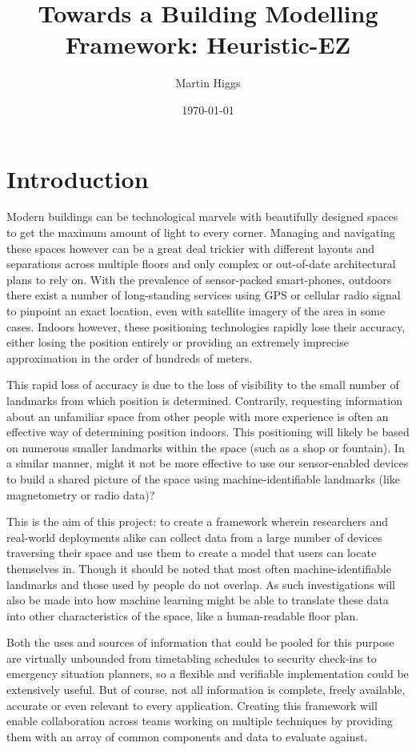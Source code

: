 \documentclass{UoYCSproject}
\title{Towards a Building Modelling Framework: Heuristic-EZ}
\author{Martin Higgs}
\date{\today}
\begin{document}
	
	\maketitle
	
	\chapter{Introduction}
    \label{chap:intro}
    
        Modern buildings can be technological marvels with beautifully designed spaces to get the maximum amount of light to every corner. Managing and navigating these spaces however can be a great deal trickier with different layouts and separations across multiple floors and only complex or out-of-date architectural plans to rely on. With the prevalence of sensor-packed smart-phones, outdoors there exist a number of long-standing services using GPS or cellular radio signal to pinpoint an exact location, even with satellite imagery of the area in some cases. Indoors however, these positioning technologies rapidly lose their accuracy, either losing the position entirely or providing an extremely imprecise approximation in the order of hundreds of meters.
        
        This rapid loss of accuracy is due to the loss of visibility to the small number of landmarks from which position is determined. Contrarily, requesting information about an unfamiliar space from other people with more experience is often an effective way of determining position indoors. This positioning will likely be based on numerous smaller landmarks within the space (such as a shop or fountain). In a similar manner, might it not be more effective to use our sensor-enabled devices to build a shared picture of the space using machine-identifiable landmarks (like magnetometry or radio data)?
        
        This is the aim of this project: to create a framework wherein researchers and real-world deployments alike can collect data from a large number of devices traversing their space and use them to create a model that users can locate themselves in. Though it should be noted that most often machine-identifiable landmarks and those used by people do not overlap. As such investigations will also be made into how machine learning might be able to translate these data into other characteristics of the space, like a human-readable floor plan. 
        
        Both the uses and sources of information that could be pooled for this purpose are virtually unbounded from timetabling schedules to security check-ins to emergency situation planners, so a flexible and verifiable implementation could be extensively useful. But of course, not all information is complete, freely available, accurate or even relevant to every application. Creating this framework will enable collaboration across teams working on multiple techniques by providing them with an array of common components and data to evaluate against.
        
\end{document}
